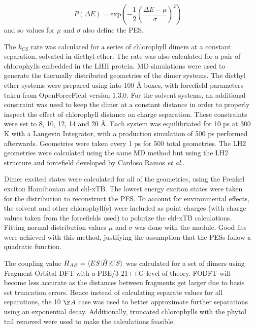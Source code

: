\begin{equation}
    P\left(\Delta E\right) = \text{exp} \left(-\frac{1}{2}\left(\frac{\Delta E - \mu}{\sigma}\right)^2\right)
\end{equation}
%
and so values for $\mu$ and $\sigma$ also define the PES. 

The $k_{CS}$ rate was calculated for a series of chlorophyll dimers at a constant
separation, solvated in diethyl ether. The rate was also calculated for a pair of
chlorophylls embedded in the LHII protein. MD simulations were used to generate 
the thermally distributed geometries of the dimer systems. The diethyl ether systems
were prepared using  into 100 \AA{} boxes, with forcefield parameters taken
from OpenForceField version 1.3.0. For the solvent systems, an additional constraint
was used to keep the dimer at a constant distance in order to properly inspect the 
effect of chlorophyll distance on charge separation. These constraints were set to
8, 10, 12, 14 and 20 \AA{}. Each system was equilibriated for 10 ps at 300 K with a
Langevin Integrator, with a production simulation of 500 ps performed afterwards. 
Geometries were taken every 1 ps for 500 total geometries. The LH2 geometries were
calculated using the same MD method but using the LH2 structure and forcefield developed
by Cardoso Ramos \emph{et al.}.

Dimer excited states were calculated for all of the geometries, using the Frenkel
exciton Hamiltonian and chl-xTB. The lowest energy exciton states were taken for 
the distribution to reconstruct the PES. To account for environmental effects, the
solvent and other chlorophyll(s) were included as point charges (with charge values 
taken from the forcefields used) to polarize the chl-xTB calculations. Fitting normal
distribution values $\mu$ and $\sigma$ was done with the  module.
Good fits were achieved with this method, justifying the assumption that the PESs
follow a quadratic function.

The coupling value $H_{AB} = \braket{ES|\hat{H}|CS}$ was calculated for a set of
dimers using Fragment Orbital DFT with a PBE/3-21++G level of theory. FODFT will
become less accurate as the distances between fragments get larger due to basis
set truncation errors. Hence instead of calculating separate values for all separations,
the 10 $\AA{}$ case was used to better approximate further separations using an
exponential decay. Additionally, truncated chlorophylls with the phytol tail removed
were used to make the calculations feasible.

